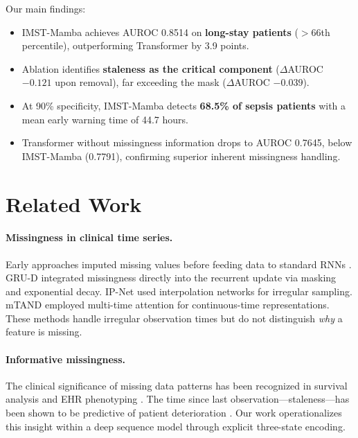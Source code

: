 \documentclass[11pt,a4paper]{article}
\begin{document}
Our main findings:
\begin{itemize}
  \item IMST-Mamba achieves AUROC 0.8514 on \textbf{long-stay patients}
        ($>$66th percentile), outperforming Transformer by 3.9 points.
  \item Ablation identifies \textbf{staleness as the critical component}
        ($\Delta$AUROC $-0.121$ upon removal), far exceeding the mask
        ($\Delta$AUROC $-0.039$).
  \item At 90\% specificity, IMST-Mamba detects \textbf{68.5\% of sepsis
        patients} with a mean early warning time of 44.7 hours.
  \item Transformer without missingness information drops to AUROC 0.7645,
        below IMST-Mamba (0.7791), confirming superior inherent missingness
        handling.
\end{itemize}

\section{Related Work}
\label{sec:related}

\paragraph{Missingness in clinical time series.}
Early approaches imputed missing values before feeding data to standard
RNNs \citep{lipton2016directly}.  GRU-D \citep{che2018gruD} integrated
missingness directly into the recurrent update via masking and exponential
decay.  IP-Net \citep{shukla2019ipnet} used interpolation networks for
irregular sampling.  mTAND \citep{shukla2021mtand} employed multi-time
attention for continuous-time representations.  These methods handle irregular
observation times but do not distinguish \emph{why} a feature is missing.

\paragraph{Informative missingness.}
The clinical significance of missing data patterns has been recognized in
survival analysis \citep{sperrin2020using} and EHR phenotyping
\citep{agniel2018biases}.  The time since last observation—staleness—has been
shown to be predictive of patient deterioration \citep{moor2019early}.  Our
work operationalizes this insight within a deep sequence model through explicit
three-state encoding.
\end{document}
